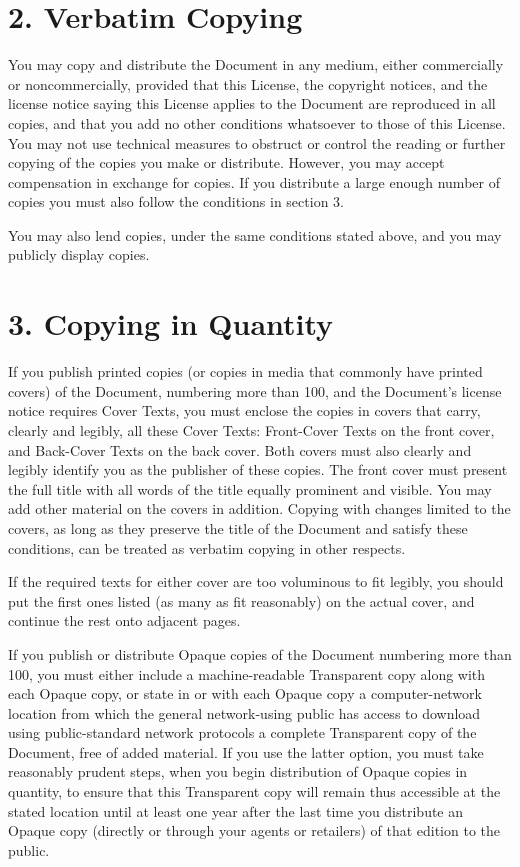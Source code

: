 \documentclass[12pt]{book}
\newcounter{exc}
\numberwithin{exc}{section}
\numberwithin{figure}{section}
\numberwithin{equation}{theorem}
\begin{document}
\section{2. Verbatim Copying}

You may copy and distribute the Document in any medium, either
commercially or noncommercially, provided that this License, the
copyright notices, and the license notice saying this License applies
to the Document are reproduced in all copies, and that you add no other
conditions whatsoever to those of this License.  You may not use
technical measures to obstruct or control the reading or further
copying of the copies you make or distribute.  However, you may accept
compensation in exchange for copies.  If you distribute a large enough
number of copies you must also follow the conditions in section 3.

You may also lend copies, under the same conditions stated above, and
you may publicly display copies.

\section{3. Copying in Quantity}

If you publish printed copies (or copies in media that commonly have
printed covers) of the Document, numbering more than 100, and the
Document's license notice requires Cover Texts, you must enclose the
copies in covers that carry, clearly and legibly, all these Cover
Texts: Front-Cover Texts on the front cover, and Back-Cover Texts on
the back cover.  Both covers must also clearly and legibly identify
you as the publisher of these copies.  The front cover must present
the full title with all words of the title equally prominent and
visible.  You may add other material on the covers in addition.
Copying with changes limited to the covers, as long as they preserve
the title of the Document and satisfy these conditions, can be treated
as verbatim copying in other respects.

If the required texts for either cover are too voluminous to fit
legibly, you should put the first ones listed (as many as fit
reasonably) on the actual cover, and continue the rest onto adjacent
pages.

If you publish or distribute Opaque copies of the Document numbering
more than 100, you must either include a machine-readable Transparent
copy along with each Opaque copy, or state in or with each Opaque copy
a computer-network location from which the general network-using
public has access to download using public-standard network protocols
a complete Transparent copy of the Document, free of added material.
If you use the latter option, you must take reasonably prudent steps,
when you begin distribution of Opaque copies in quantity, to ensure
that this Transparent copy will remain thus accessible at the stated
location until at least one year after the last time you distribute an
Opaque copy (directly or through your agents or retailers) of that
edition to the public.
\end{document}
